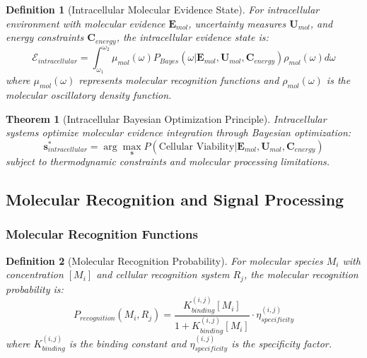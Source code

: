 \documentclass[12pt,a4paper]{article}
\newtheorem{theorem}{Theorem}
\newtheorem{definition}{Definition}
\begin{document}
\begin{definition}[Intracellular Molecular Evidence State]
For intracellular environment with molecular evidence $\mathbf{E}_{mol}$, uncertainty measures $\mathbf{U}_{mol}$, and energy constraints $\mathbf{C}_{energy}$, the intracellular evidence state is:
\begin{equation}
\mathcal{E}_{intracellular} = \int_{\omega_1}^{\omega_2} \mu_{mol}(\omega) P_{Bayes}(\omega | \mathbf{E}_{mol}, \mathbf{U}_{mol}, \mathbf{C}_{energy}) \rho_{mol}(\omega) d\omega
\end{equation}
where $\mu_{mol}(\omega)$ represents molecular recognition functions and $\rho_{mol}(\omega)$ is the molecular oscillatory density function.
\end{definition}

\begin{theorem}[Intracellular Bayesian Optimization Principle]
Intracellular systems optimize molecular evidence integration through Bayesian optimization:
\begin{equation}
\mathbf{s}^*_{intracellular} = \arg\max_{\mathbf{s}} P(\text{Cellular Viability} | \mathbf{E}_{mol}, \mathbf{U}_{mol}, \mathbf{C}_{energy})
\end{equation}
subject to thermodynamic constraints and molecular processing limitations.
\end{theorem}

\subsection{Molecular Recognition and Signal Processing}

\subsubsection{Molecular Recognition Functions}

\begin{definition}[Molecular Recognition Probability]
For molecular species $M_i$ with concentration $[M_i]$ and cellular recognition system $R_j$, the molecular recognition probability is:
\begin{equation}
P_{recognition}(M_i, R_j) = \frac{K_{binding}^{(i,j)} [M_i]}{1 + K_{binding}^{(i,j)} [M_i]} \cdot \eta_{specificity}^{(i,j)}
\end{equation}
where $K_{binding}^{(i,j)}$ is the binding constant and $\eta_{specificity}^{(i,j)}$ is the specificity factor.
\end{definition}
\end{document}
